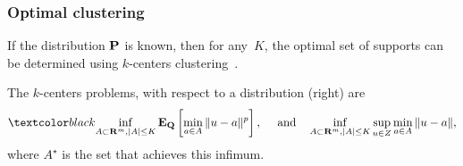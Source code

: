 
\subsubsection{Optimal clustering} 
\label{sec:optimal_cluster}
If the distribution ${\mathbf P}$ is known, then for any~$K$, the optimal set of supports can be determined using $k$-centers clustering~\cite[Chapter 1]{quantization}. 
\begin{definition}[$k$-centers]
    \label{def:k_center}
    The $k$-centers problems, with respect to a distribution  (right) are
\begin{equation}
    \label{def:k_centers}
    \RC{\inf_{A \subset \reals^m, |A|\leq K}\Expect_\mathbf{Q}\left[\min_{a \in A}\|u - a\|^{\barp}\right], ~\quad\text{and}\quad \inf_{A \subset \reals^m, |A|\leq K}\sup_{u \in Z}\min_{a \in A}\|u - a\|,}
\end{equation}
where $A^\star$ is the set that achieves this infimum. 
\end{definition}

\begin{definition}
\label{def:quantization}
\end{definition}

